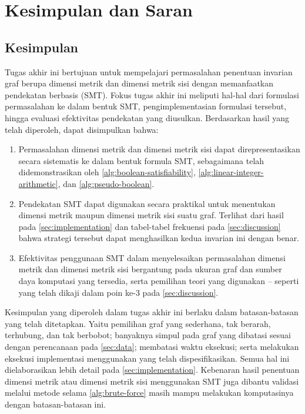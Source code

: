 \chapter{Kesimpulan dan Saran}

\section{Kesimpulan}

Tugas akhir ini bertujuan untuk mempelajari permasalahan penentuan invarian graf berupa dimensi metrik dan dimensi metrik sisi dengan memanfaatkan pendekatan berbasis  (SMT). Fokus tugas akhir ini meliputi hal-hal dari formulasi permasalahan ke dalam bentuk SMT, pengimplementasian formulasi tersebut, hingga evaluasi efektivitas pendekatan yang diusulkan. Berdasarkan hasil yang telah diperoleh, dapat disimpulkan bahwa:

\begin{enumerate}
	\item Permasalahan dimensi metrik dan dimensi metrik sisi dapat direpresentasikan secara sistematis ke dalam bentuk formula SMT, sebagaimana telah didemonstrasikan oleh \autoref{alg:boolean-satisfiability}, \autoref{alg:linear-integer-arithmetic}, dan \autoref{alg:pseudo-boolean}.

	\item Pendekatan SMT dapat digunakan secara praktikal untuk menentukan dimensi metrik maupun dimensi metrik sisi suatu graf. Terlihat dari hasil pada \autoref{sec:implementation} dan tabel-tabel frekuensi pada \autoref{sec:discussion} bahwa strategi tersebut dapat menghasilkan kedua invarian ini dengan benar.

	\item Efektivitas penggunaan SMT dalam menyelesaikan permasalahan dimensi metrik dan dimensi metrik sisi bergantung pada ukuran graf dan sumber daya komputasi yang tersedia, serta pemilihan teori yang digunakan -- seperti yang telah dikaji dalam poin ke-3 pada \autoref{sec:discussion}.
\end{enumerate}

Kesimpulan yang diperoleh dalam tugas akhir ini berlaku dalam batasan-batasan yang telah ditetapkan. Yaitu pemilihan graf yang sederhana, tak berarah, terhubung, dan tak berbobot; banyaknya simpul pada graf yang dibatasi sesuai dengan perencanaan pada \autoref{sec:data}; membatasi waktu eksekusi; serta melakukan eksekusi implementasi menggunakan  yang telah dispesifikasikan. Semua hal ini dielaborasikan lebih detail pada \autoref{sec:implementation}. Kebenaran hasil penentuan dimensi metrik atau dimensi metrik sisi menggunakan SMT juga dibantu validasi melalui metode  selama \autoref{alg:brute-force} masih mampu melakukan komputasinya dengan batasan-batasan ini.

